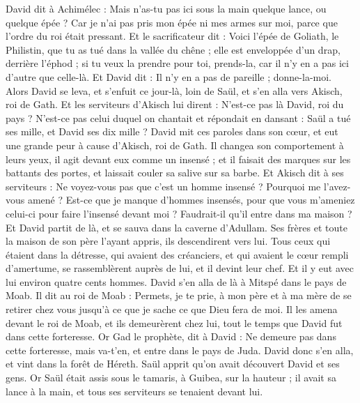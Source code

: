 \begin{multicols}{2}
David dit à Achimélec : Mais n'as-tu pas ici sous la main quelque lance, ou quelque épée ? Car je n'ai pas pris mon épée ni mes armes sur moi, parce que l'ordre du roi était pressant.
Et le sacrificateur dit : Voici l'épée de Goliath, le Philistin, que tu as tué dans la vallée du chêne ; elle est enveloppée d'un drap, derrière l'éphod ; si tu veux la prendre pour toi, prends-la, car il n'y en a pas ici d'autre que celle-là. Et David dit : Il n'y en a pas de pareille ; donne-la-moi.
Alors David se leva, et s'enfuit ce jour-là, loin de Saül, et s'en alla vers Akisch, roi de Gath.
Et les serviteurs d'Akisch lui dirent : N'est-ce pas là David, roi du pays ? N'est-ce pas celui duquel on chantait et répondait en dansant : Saül a tué ses mille, et David ses dix mille ?
David mit ces paroles dans son cœur, et eut une grande peur à cause d'Akisch, roi de Gath.
Il changea son comportement à leurs yeux, il agit devant eux comme un insensé ; et il faisait des marques sur les battants des portes, et laissait couler sa salive sur sa barbe.
Et Akisch dit à ses serviteurs : Ne voyez-vous pas que c'est un homme insensé ? Pourquoi me l'avez-vous amené ?
Est-ce que je manque d'hommes insensés, pour que vous m'ameniez celui-ci pour faire l'insensé devant moi ? Faudrait-il qu'il entre dans ma maison ?
\VerseOne{}Et David partit de là, et se sauva dans la caverne d'Adullam. Ses frères et toute la maison de son père l'ayant appris, ils descendirent vers lui.
Tous ceux qui étaient dans la détresse, qui avaient des créanciers, et qui avaient le cœur rempli d'amertume, se rassemblèrent auprès de lui, et il devint leur chef. Et il y eut avec lui environ quatre cents hommes.
David s'en alla de là à Mitspé dans le pays de Moab. Il dit au roi de Moab : Permets, je te prie, à mon père et à ma mère de se retirer chez vous jusqu'à ce que je sache ce que Dieu fera de moi.
Il les amena devant le roi de Moab, et ils demeurèrent chez lui, tout le temps que David fut dans cette forteresse.
Or Gad le prophète, dit à David : Ne demeure pas dans cette forteresse, mais va-t'en, et entre dans le pays de Juda. David donc s'en alla, et vint dans la forêt de Héreth.
Saül apprit qu'on avait découvert David et ses gens. Or Saül était assis sous le tamaris, à Guibea, sur la hauteur ; il avait sa lance à la main, et tous ses serviteurs se tenaient devant lui.

\end{multicols}
